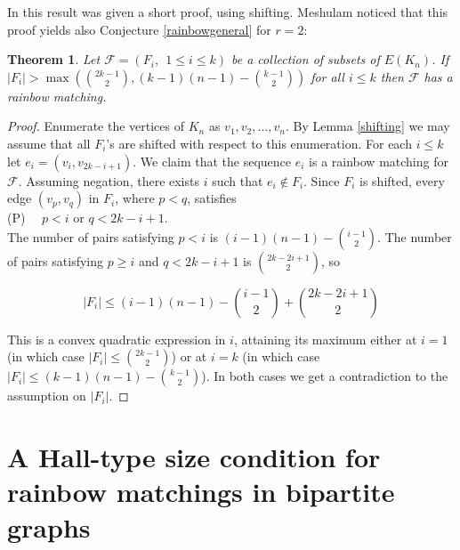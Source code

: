 \documentclass{amsart}
\newtheorem{theorem}{Theorem}[section]
\theoremstyle{remark}
\newcommand{\cf}{\mathcal F}
\begin{document}
In \cite{af} this result was given a short proof, using shifting.
Meshulam \cite{meshulam} noticed that this proof yields also
Conjecture \ref{rainbowgeneral} for $r=2$:

\begin{theorem}\label{af}
Let $\cf=(F_i, ~~1 \le i \le k)$ be a collection of subsets of
$E(K_n)$. If $|F_i|>
\max(\binom{2k-1}{2},(k-1)(n-1)-\binom{k-1}{2})$ for all $i \le k$
then $\cf$ has a rainbow matching.
\end{theorem}


\begin{proof}
Enumerate the vertices of $K_n$ as $v_1,v_2,\ldots, v_n$. By Lemma
\ref{shifting} we may assume that all $F_i$'s are shifted with
respect to this enumeration. For each $i \le k$ let
$e_i=(v_i,v_{2k-i+1})$. We claim that the sequence $e_i$ is a
rainbow matching for $\cf$. Assuming negation, there exists $i$ such
that $e_i \not \in F_i$. Since $F_i$ is shifted, every edge
$(v_p,v_q)$ in $F_i$, where $p<q$, satisfies\\

(P)~~ $p<i$ or $q<2k-i+1$.
\\

The number of  pairs satisfying $p<i$ is
$(i-1)(n-1)-\binom{i-1}{2}$. The number of pairs satisfying $p\ge i$
and $q<2k-i+1$ is $\binom{2k-2i+1}{2}$, so

$$|F_i| \le (i-1)(n-1)-\binom{i-1}{2} + \binom{2k-2i+1}{2}$$

This is a convex quadratic expression in $i$, attaining its maximum
either at $i=1$ (in which case $|F_i| \le \binom{2k-1}{2}$) or at
$i=k$ (in which case $|F_i| \le (k-1)(n-1)-\binom{k-1}{2}$). In both
cases we get a contradiction to the assumption on $|F_i|$.
\end{proof}

























\section{A Hall-type size condition for rainbow matchings in bipartite graphs}
\end{document}
